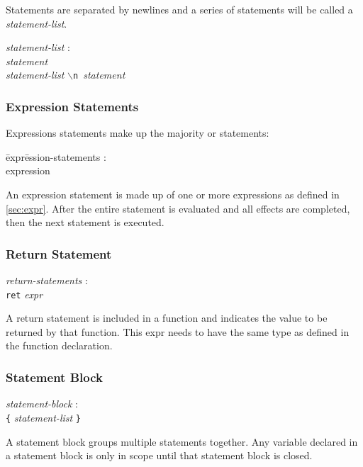 \documentclass{article}
\begin{document}
Statements are separated by newlines and a series of statements will be called a \emph{statement-list}. 
\begin{tabbing}
	\= \emph{stat}\=\emph{ement-list} : \\
		\> \> \emph{statement} \\
		\> \> \emph{statement-list} \texttt{$\backslash$n }\emph{statement}
\end{tabbing}


\subsubsection{Expression Statements}
Expressions statements make up the majority or statements:

\begin{itshape}
\begin{tabbing}
	\= expr\=ession-statements : \\
		\>\> expression 
\end{tabbing}
\end{itshape}

An expression statement is made up of one or more expressions as defined in \ref{sec:expr}. After the entire statement is evaluated and all effects are completed, then the next statement is executed.

\subsubsection{Return Statement}
\begin{tabbing}
	\= \emph{ret}\=\emph{urn-statements} : \\
		\>\> \texttt{ret} \emph{expr}
\end{tabbing}

A return statement is included in a function and indicates the value to be returned by that function. This expr needs to have the same type as defined in the function declaration.

\subsubsection{Statement Block}
\begin{tabbing}
	\= \emph{stat}\=\emph{ement-block} : \\
		\>\> \texttt{\{} \emph{statement-list} \texttt{\}}
\end{tabbing}

A statement block groups multiple statements together. Any variable declared in a statement block is only in scope until that statement block is closed.
\end{document}
